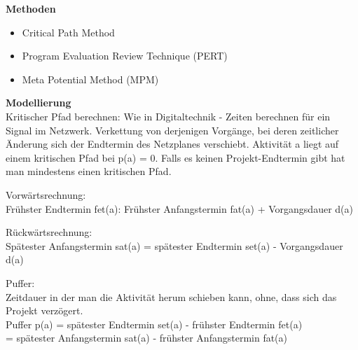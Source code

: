 \textbf{Methoden}
\begin{multicols}{2}
\begin{itemize}
	\item Critical Path Method
	\item Program Evaluation Review Technique (PERT)
	\item Meta Potential Method (MPM)  
\end{itemize}
\columnbreak


\end{multicols}

\textbf{Modellierung} \\
Kritischer Pfad berechnen:
Wie in Digitaltechnik - Zeiten berechnen für ein Signal im Netzwerk.
Verkettung von derjenigen Vorgänge, bei 
deren zeitlicher Änderung sich der 
Endtermin des Netzplanes verschiebt. Aktivität a liegt auf einem kritischen Pfad bei p(a) = 0. Falls es keinen Projekt-Endtermin gibt hat man mindestens einen kritischen Pfad.

Vorwärtsrechnung: \\
Frühster Endtermin fet(a): Frühster Anfangstermin fat(a) + Vorgangsdauer d(a)

Rückwärtsrechnung: \\
Spätester Anfangstermin sat(a) = spätester Endtermin set(a) - Vorgangsdauer d(a)

Puffer: \\
Zeitdauer in der man die Aktivität herum schieben kann, ohne, dass sich das Projekt verzögert.
\\ Puffer p(a) = spätester Endtermin set(a) - frühster Endtermin fet(a) \\
 = spätester Anfangstermin sat(a) - frühster Anfangstermin fat(a)

